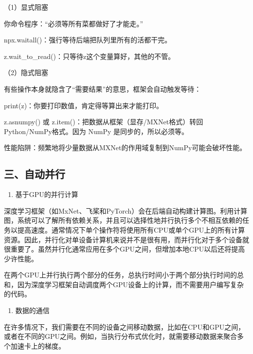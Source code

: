 （1）显式阻塞

你命令程序：``必须等所有菜都做好了才能走。''

npx.waitall()：强行等待后端把队列里所有的活都干完。

z.wait\_to\_read()：只等待z这个变量算好，其他的不管。

（2）隐式阻塞

有些操作本身就隐含了``需要结果''的意思，框架会自动触发等待：

print(z)：你要打印数值，肯定得等算出来才能打印。

z.asnumpy() 或 z.item()：把数据从框架（显存/MXNet格式）转回Python/NumPy格式。因为 NumPy 是同步的，所以必须等。

性能陷阱：频繁地将少量数据从MXNet的作用域复制到NumPy可能会破坏性能。

\hypertarget{ux4e09ux81eaux52a8ux5e76ux884c}{%
\subsection{三、自动并行}\label{ux4e09ux81eaux52a8ux5e76ux884c}}

\begin{enumerate}
\def\labelenumi{\arabic{enumi}.}
\tightlist
\item
  基于GPU的并行计算
\end{enumerate}

深度学习框架（如MxNet、飞桨和PyTorch）会在后端自动构建计算图。利用计算图，系统可以了解所有依赖关系，并且可以选择性地并行执行多个不相互依赖的任务以提高速度。通常情况下单个操作符将使用所有CPU或单个GPU上的所有计算资源。因此，并行化对单设备计算机来说并不是很有用，而并行化对于多个设备就很重要了。虽然并行化通常应用在多个GPU之间，但增加本地CPU以后还将提高少许性能。

在两个GPU上并行执行两个部分的任务，总执行时间小于两个部分执行时间的总和，因为深度学习框架自动调度两个GPU设备上的计算，而不需要用户编写复杂的代码。

\begin{enumerate}
\def\labelenumi{\arabic{enumi}.}
\setcounter{enumi}{1}
\tightlist
\item
  数据的通信
\end{enumerate}

在许多情况下，我们需要在不同的设备之间移动数据，比如在CPU和GPU之间，或者在不同的GPU之间。例如，当执行分布式优化时，就需要移动数据来聚合多个加速卡上的梯度。

